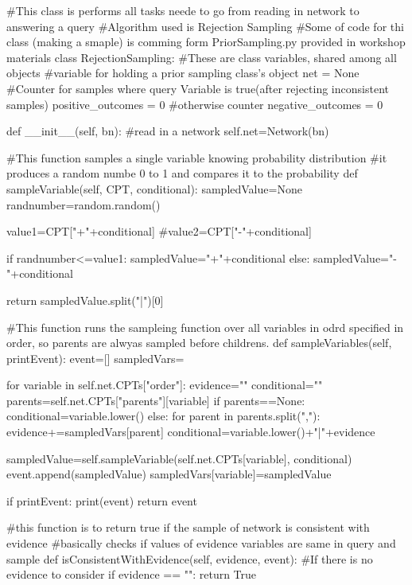 \documentclass[10pt]{article}
\begin{document}
\begin{spverbatim}
#This class is performs all tasks neede to go from reading in network to answering a query
#Algorithm used is Rejection Sampling
#Some of code for thi class (making a smaple) is comming form PriorSampling.py provided in workshop materials
class RejectionSampling:
    #These are class variables, shared among all objects
    #variable for holding a prior sampling class's object
    net = None
    #Counter for samples where query Variable is true(after rejecting inconsistent samples)
    positive_outcomes = 0
    #otherwise counter
    negative_outcomes = 0
    
    def __init__(self, bn):
        #read in a network
        self.net=Network(bn)
    
    #This function samples a single variable knowing probability distribution
    #it produces a random numbe 0 to 1 and compares it to the probability
    def sampleVariable(self, CPT, conditional):
        sampledValue=None
        randnumber=random.random()

        value1=CPT["+"+conditional]
        #value2=CPT["-"+conditional]

        if randnumber<=value1:
            sampledValue="+"+conditional
        else:
            sampledValue="-"+conditional

        return sampledValue.split("|")[0]
    
    #This function runs the sampleing function over all variables in odrd specified in order, so parents are alwyas sampled before childrens.
    def sampleVariables(self, printEvent):
        event=[]
        sampledVars={}

        for variable in self.net.CPTs["order"]:
            evidence=""
            conditional=""
            parents=self.net.CPTs["parents"][variable]
            if parents==None:
                conditional=variable.lower()
            else:
                for parent in parents.split(","):
                    evidence+=sampledVars[parent]
                conditional=variable.lower()+"|"+evidence

            sampledValue=self.sampleVariable(self.net.CPTs[variable], conditional)
            event.append(sampledValue)
            sampledVars[variable]=sampledValue
				
        if printEvent: print(event)
        return event
    
    #this function is to return true if the sample of network is consistent with evidence
    #basically checks if values of evidence variables are same in query and sample
    def isConsistentWithEvidence(self,  evidence,  event):
        #If there is no evidence to consider
        if evidence == "": 
            return True
     

\end{spverbatim}
\end{document}
